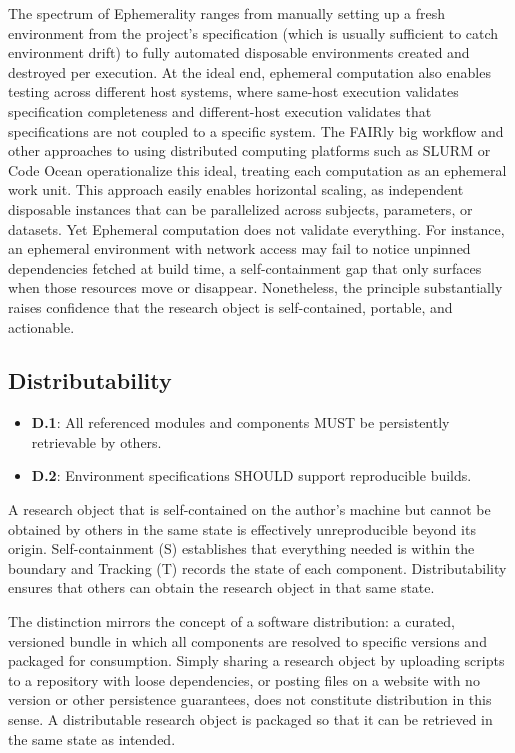 \documentclass{article}
\makeatletter
\newcommand{\hyanchor}[1]{\texorpdfstring{\Hy@raisedlink{\hypertarget{#1}{}}}{}}
\newcommand{\anchoredsubsection}[2]{\subsection[#2]{\hyanchor{#1}#2}}
\makeatother
\begin{document}
The spectrum of Ephemerality ranges from manually setting up a fresh environment from the project's specification (which is usually sufficient to catch environment drift) to fully automated disposable environments created and destroyed per execution.
At the ideal end, ephemeral computation also enables testing across different host systems, where same-host execution validates specification completeness and different-host execution validates that specifications are not coupled to a specific system.
The FAIRly big workflow\cite{wagner_fairly_2022} and other approaches to using distributed computing platforms such as SLURM or Code Ocean operationalize this ideal, treating each computation as an ephemeral work unit.
This approach easily enables horizontal scaling, as independent disposable instances that can be parallelized across subjects, parameters, or datasets.
Yet Ephemeral computation does not validate everything.
For instance, an ephemeral environment with network access may fail to notice unpinned dependencies fetched at build time, a self-containment gap that only surfaces when those resources move or disappear.
Nonetheless, the principle substantially raises confidence that the research object is self-contained, portable, and actionable.



\anchoredsubsection{distributability}{Distributability}

\begin{itemize}
    \item \textbf{D.1}: All referenced modules and components MUST be persistently retrievable by others.
    \item \textbf{D.2}: Environment specifications SHOULD support reproducible builds.
\end{itemize}

A research object that is self-contained on the author's machine but cannot be obtained by others in the same state is effectively unreproducible beyond its origin.
Self-containment (S) establishes that everything needed is within the boundary and Tracking (T) records the state of each component.
Distributability ensures that others can obtain the research object in that same state.

The distinction mirrors the concept of a software distribution: a curated, versioned bundle in which all components are resolved to specific versions and packaged for consumption.
Simply sharing a research object by uploading scripts to a repository with loose dependencies, or posting files on a website with no version or other persistence guarantees, does not constitute distribution in this sense.
A distributable research object is packaged so that it can be retrieved in the same state as intended.
\end{document}
